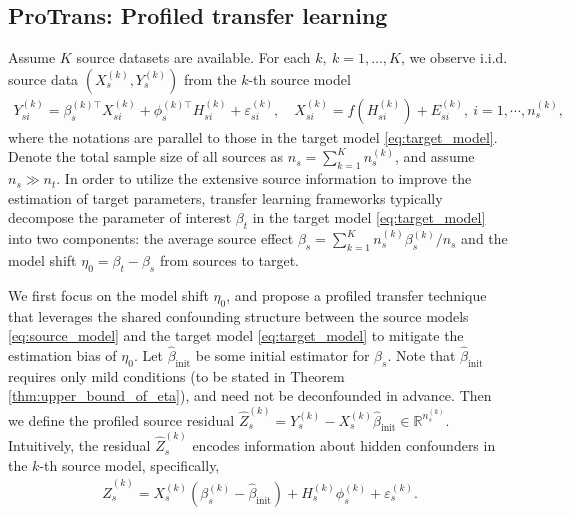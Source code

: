 \documentclass[12pt]{article}
\begin{document}
\subsection{ProTrans: Profiled transfer learning}

Assume $K$ source datasets are available. For each $k, \ k=1,\ldots,K$, we observe i.i.d. source data $(X^{(k)}_{s},Y^{(k)}_{s})$ from the $k$-th source model 
\begin{align}
\label{eq:source_model}
    Y^{(k)}_{si} = \beta^{(k)\top}_s X^{(k)}_{si} + \phi^{(k)\top}_s H^{(k)}_{si} + \varepsilon^{(k)}_{si},\quad X^{(k)}_{si} = f(H^{(k)}_{si}) +E^{(k)}_{si}, \ i=1,\cdots,n_s^{(k)},
\end{align}
where the notations are parallel to those in the target model \eqref{eq:target_model}.  %
Denote the total sample size of all sources as $n_s = \sum_{k=1}^K n_s^{(k)}$, and assume $n_s\gg n_t$.  
In order to utilize the extensive source information to improve the estimation of target parameters, transfer learning frameworks typically decompose the parameter of interest $\beta_t$ in the target model \eqref{eq:target_model} into two components: the average source effect $\beta_s = \sum_{k=1}^K n_s^{(k)}\beta_s^{(k)}/n_s$ and the model shift $\eta_0 = \beta_t-\beta_s$ from sources to target. %

We first focus on the model shift $\eta_0$, and propose a profiled transfer technique that leverages the shared confounding structure between the source models \eqref{eq:source_model} and the target model \eqref{eq:target_model} to mitigate the estimation bias of $\eta_0$. 
Let $\hat{\beta}_{\text{init}}$ be some initial estimator for $\beta_s$. Note that $\hat{\beta}_{\text{init}}$ requires only mild conditions (to be stated in Theorem \ref{thm:upper_bound_of_eta}), and need not be deconfounded in advance. Then we define the profiled source residual $\hat{Z}_s^{(k)} = Y^{(k)}_s - X^{(k)}_s\hat{\beta}_{\text{init}}\in \mathbb{R}^{n_s^{(k)}}$. Intuitively, the residual $\hat{Z}_s^{(k)}$ encodes information about hidden confounders in the $k$-th source model, specifically,
\begin{align*}
    \hat{Z}_s^{(k)} = X_s^{(k)}\left(\beta_s^{(k)} - \hat{\beta}_{\text{init}}\right) + H_s^{(k)} \phi_s^{(k)} + \varepsilon_s^{(k)}.
\end{align*}
\end{document}
